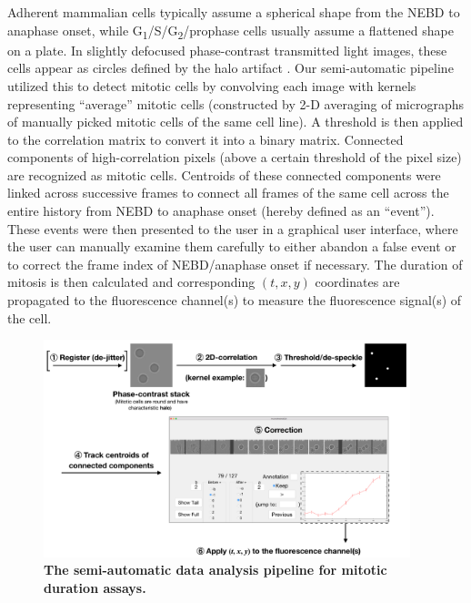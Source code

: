 Adherent mammalian cells typically assume a spherical shape from the NEBD to anaphase onset, while G\textsubscript{1}/S/G\textsubscript{2}/prophase cells usually assume a flattened shape on a plate. In slightly defocused phase-contrast transmitted light images, these cells appear as circles defined by the halo artifact \cite{PhaseContrastHalo}. Our semi-automatic pipeline utilized this to detect mitotic cells by convolving each image with kernels representing ``average'' mitotic cells (constructed by 2-D averaging of micrographs of manually picked mitotic cells of the same cell line). A threshold is then applied to the correlation matrix to convert it into a binary matrix. Connected components of high-correlation pixels (above a certain threshold of the pixel size) are recognized as mitotic cells. Centroids of these connected components were linked across successive frames to connect all frames of the same cell across the entire history from NEBD to anaphase onset (hereby defined as an ``event''). These events were then presented to the user in a graphical user interface, where the user can manually examine them carefully to either abandon a false event or to correct the frame index of NEBD/anaphase onset if necessary. The duration of mitosis is then calculated and corresponding $(t, x, y)$ coordinates are propagated to the fluorescence channel(s) to measure the fluorescence signal(s) of the cell.

\begin{figure}
    \centering
    \includegraphics[width=0.95\textwidth]{chapters/figures/DataAnalysisPipeline.pdf}
    \caption{\textbf{The semi-automatic data analysis pipeline for mitotic duration assays.}}
    \label{DataAnalysisPipeline}
\end{figure}

